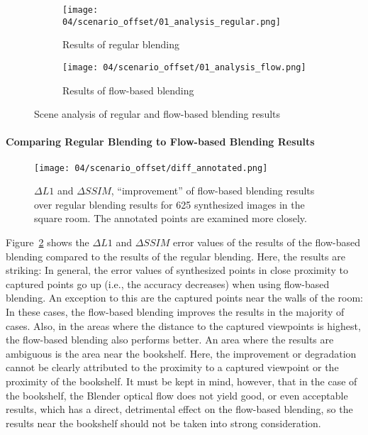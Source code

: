 \begin{figure}
\centering
    \hfill
    \begin{subfigure}[b]{0.45\textwidth}
            \centering
            \texttt{[image: 04/scenario\_offset/01\_analysis\_regular.png]}
            \caption{Results of regular blending}
    \end{subfigure}
    \hfill
    \begin{subfigure}[b]{0.45\textwidth}
            \centering
            \texttt{[image: 04/scenario\_offset/01\_analysis\_flow.png]}
            \caption{Results of flow-based blending}
    \end{subfigure}
    \hfill
  \caption{Scene analysis of regular and flow-based blending results} \label{fig:offset_regular_flow}
\end{figure}

\paragraph{Comparing Regular Blending to Flow-based Blending Results}

\begin{figure}
		\centering
		\texttt{[image: 04/scenario\_offset/diff\_annotated.png]}
		\caption[$\Delta L1$ and $\Delta SSIM$, ``improvement'' of flow-based blending results over regular blending results for 625 synthesized images]{$\Delta L1$ and $\Delta SSIM$, ``improvement'' of flow-based blending results over regular blending results for 625 synthesized images in the square room. The annotated points are examined more closely.}
		\label{fig:scenario_offset_diff}
\end{figure}

Figure~\ref{fig:scenario_offset_diff} shows the $\Delta L1$ and $\Delta SSIM$ error values of the results of the flow-based blending compared to the results of the regular blending. Here, the results are striking: In general, the error values of synthesized points in close proximity to captured points go up (i.e., the accuracy decreases) when using flow-based blending. An exception to this are the captured points near the walls of the room: In these cases, the flow-based blending improves the results in the majority of cases. Also, in the areas where the distance to the captured viewpoints is highest, the flow-based blending also performs better. An area where the results are ambiguous is the area near the bookshelf. Here, the improvement or degradation cannot be clearly attributed to the proximity to a captured viewpoint or the proximity of the bookshelf. It must be kept in mind, however, that in the case of the bookshelf, the Blender optical flow does not yield good, or even acceptable results, which has a direct, detrimental effect on the flow-based blending, so the results near the bookshelf should not be taken into strong consideration.

